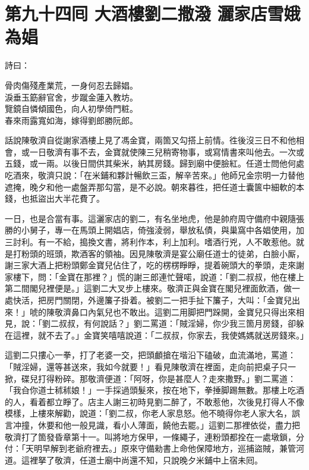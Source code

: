 
\chapter*{第九十四囘 大酒樓劉二撒潑 灑家店雪娥為娼}


詩曰：

\begin{myquote}
骨肉傷殘產業荒，一身何忍去歸娼。\\淚垂玉筯辭官舍，步蹴金蓮入教坊。\\覽鏡自憐傾國色，向人初學倚門粧。\\春來雨露寬如海，嫁得劉郎勝阮郎。
\end{myquote}

話說陳敬濟自從謝家酒樓上見了馮金寶，兩箇又勾搭上前情。徃後沒三日不和他相會，或一日敬濟有事不去，金寶就使陳三兒稍寄物事，或寫情書來叫他去。一次或五錢，或一兩。以後日間供其柴米，納其房錢。歸到廟中便臉紅。任道士問他何處吃酒來，敬濟只說：「在米鋪和夥計暢飲三盃，解辛苦來。」他師兄金宗明一力替他遮掩，晚夕和他一處盤弄那勾當，是不必說。朝來暮徃，把任道士囊篋中細軟的本錢，也抵盜出大半花費了。

一日，也是合當有事。這灑家店的劉二，有名坐地虎，他是帥府周守備府中親隨張勝的小舅子，專一在馬頭上開娼店，倚強淩弱，舉放私債，與巢窩中各娼使用，加三討利。有一不給，搗換文書，將利作本，利上加利。嗜酒行兇，人不敢惹他。就是打粉頭的班頭，欺酒客的領袖。因見陳敬濟是宴公廟任道士的徒弟，白臉小厮，謝三家大酒上把粉頭鄭金寶兒佔住了，吃的楞楞睜睜，提着碗頭大的拳頭，{}走來謝家樓下，問：「金寶在那裡？」慌的謝三郎連忙聲喏，說道：「劉二叔叔，他在樓上第二間閣兒裡便是。」這劉二大叉步上樓來。敬濟正與金寶在閣兒裡面飲酒，做一處快活，把房門關閉，外邊簾子掛着。被劉二一把手扯下簾子，大叫：「金寶兒出來！」唬的陳敬濟鼻口內氣兒也不敢出。這劉二用脚把門跺開，金寶兒只得出來相見，說：「劉二叔叔，有何說話？」劉二罵道：「賊淫婦，你少我三箇月房錢，卻躲在這裡，就不去了。」金寶笑嘻嘻說道：「二叔叔，你家去，我使媽媽就送房錢來。」

這劉二只摟心一拳，打了老婆一交，把頭顱搶在堦沿下磕破，血流滿地，罵道：「賊淫婦，還等甚送來，我如今就要！」看見陳敬濟在裡面，走向前把桌子只一掀，碟兒打得粉碎。那敬濟便道：「阿呀，你是甚麼人？走來撒野。」劉二罵道：「我㒲你道士秫秫娘！」一手採過頭髮來，按在地下，拳捶脚踢無數。那樓上吃酒的人，看着都立睜了。店主人謝三初時見劉二醉了，不敢惹他，次後見打得人不像模樣，上樓來解勸，說道：「劉二叔，你老人家息怒。他不曉得你老人家大名，誤言冲撞，休要和他一般見識，看小人薄面，饒他去罷。」這劉二那裡依從，盡力把敬濟打了箇發昏章第十一。叫將地方保甲，一條繩子，連粉頭都拴在一處墩鎖，分付：「天明早解到老爺府裡去。」原來守備勑書上命他保障地方，巡捕盜賊，兼管河道。這裡拏了敬濟，任道士廟中尚還不知，只說晚夕米鋪中上宿未囘。

